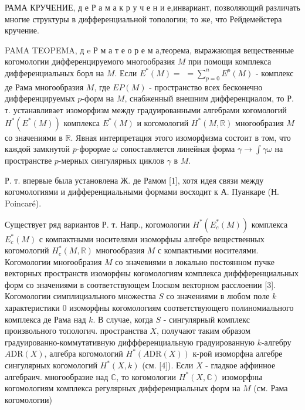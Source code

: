 \documentclass[10pt]{article}
\begin{document}
РАМА КРУЧЕНИЕ, д е Р а м а к р у ч е н и е,инвариант, позволяющий различать многие структуры в дифференциальной топологии; то же, что Рейдемейстера кручение.



PAMA TEOPEMA, д $\mathrm{e}$ Р м а т е о р е м а,теорема, выражающая вещественные когомологии дифференцируемого многообразия $M$ при помощи комплекса дифференциальных борл на $M$. Если $E^{*}(M)=$ $=\sum_{p=0}^{n} E^{p}(M)$ - комплекс де Рама многообразия $M$, где $E P(M)$ - пространство всех бесконечно дифференцируемых $p$-форм на $M$, снабженный внешним дифференциалом, то Р. т. устанавливает изоморфизм между градуированными алгебрами когомологий $H^{*}\left(E^{*}(M)\right)$ комплекса $E^{*}(M)$ и когомологий $H^{*}(M, \mathbb{R})$ многообразия $M$ со значениями в $\mathbb{R}$. Явная интерпретация этого изоморфизма состоит в том, что каждой замкнутой $p$-форорме $\omega$ сопоставляется линейная форма $\gamma \rightarrow \int \gamma \omega$ на пространстве $p$-мерных сингулярных циклов $\gamma$ в $M$.



Р. т. впервые была установлена Ж. де Рамом [1], хотя идея связи между когомологиями и дифференциальными формами восходит к А. Пуанкаре (Н. Poincaré).



Существует ряд вариантов Р. т. Напр., когомологии $H^{*}\left(E_{c}^{*}(M)\right)$ комплекса $E_{c}^{*}(M)$ с компактными носителями изоморфыы алгебре вещественных когомологий $H_{c}^{*}(M, \mathbb{R})$ многообразия $M$ с компактными носителями. Когомологии многообразия $M$ со значевиями в локально постоянном пучке векторных пространств изоморфны когомологиям комплекса диффференциальных форм со значениями в соответствующем Ілоском векторном расслоении [3]. Когомологии симплициального множества $S$ со значениями в любом поле $k$ характеристики 0 изоморфны когомологиям соответствующего полиномиального комплекса де Рама над $k$. В случае, когда $S$ - сингулярный комплекс произвольного топологич. пространства $X$, получают таким образом градуированно-коммутативную диффференциальную градуированную $k$-алгебру $A \mathrm{DR}(X)$, алгебра когомологий $H^{*}(A \mathrm{DR}(X))$ к-рой изоморфна алгебре сингулярных когомологий $H^{*}(X, k)$ (см. [4]). Если $X$ - гладкое аффинное алгебраич. многообразие над $\mathbb{C}$, то когомологии $H^{*}(X, \mathbb{C})$ изоморфны когомологиям комплекса регулярных дифференциальных форм на $M$ (см. Рама когомологии)
\end{document}
